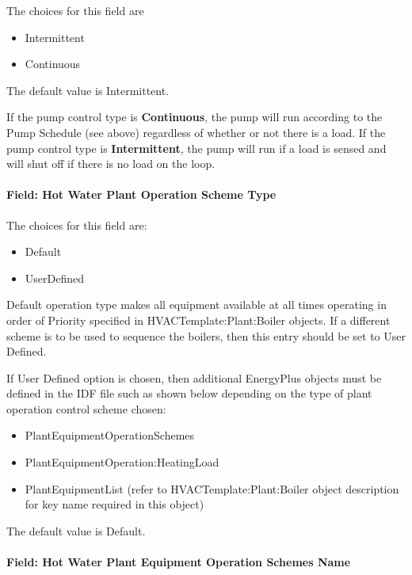 The choices for this field are

\begin{itemize}
\item
  Intermittent
\item
  Continuous
\end{itemize}

The default value is Intermittent.

If the pump control type is \textbf{Continuous}, the pump will run according to the Pump Schedule (see above) regardless of whether or not there is a load. If the pump control type is \textbf{Intermittent}, the pump will run if a load is sensed and will shut off if there is no load on the loop.

\paragraph{Field: Hot Water Plant Operation Scheme Type}\label{field-hot-water-plant-operation-scheme-type}

The choices for this field are:

\begin{itemize}
\item
  Default
\item
  UserDefined
\end{itemize}

Default operation type makes all equipment available at all times operating in order of Priority specified in HVACTemplate:Plant:Boiler objects. If a different scheme is to be used to sequence the boilers, then this entry should be set to User Defined.

If User Defined option is chosen, then additional EnergyPlus objects must be defined in the IDF file such as shown below depending on the type of plant operation control scheme chosen:

\begin{itemize}
\item
  PlantEquipmentOperationSchemes
\item
  PlantEquipmentOperation:HeatingLoad
\item
  PlantEquipmentList (refer to HVACTemplate:Plant:Boiler object description for key name required in this object)
\end{itemize}

The default value is Default.

\paragraph{Field: Hot Water Plant Equipment Operation Schemes Name}\label{field-hot-water-plant-equipment-operation-schemes-name}


